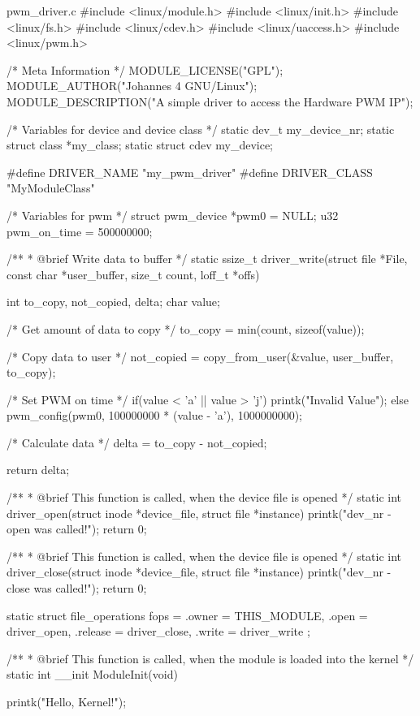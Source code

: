 \documentclass[lang=cn,newtx,10pt,scheme=chinese]{elegantbook}
\begin{document}
\begin{mycode}{pwm\_driver.c}
#include <linux/module.h>
#include <linux/init.h>
#include <linux/fs.h>
#include <linux/cdev.h>
#include <linux/uaccess.h>
#include <linux/pwm.h>

/* Meta Information */
MODULE_LICENSE("GPL");
MODULE_AUTHOR("Johannes 4 GNU/Linux");
MODULE_DESCRIPTION("A simple driver to access the Hardware PWM IP");

/* Variables for device and device class */
static dev_t my_device_nr;
static struct class *my_class;
static struct cdev my_device;

#define DRIVER_NAME "my_pwm_driver"
#define DRIVER_CLASS "MyModuleClass"

/* Variables for pwm  */
struct pwm_device *pwm0 = NULL;
u32 pwm_on_time = 500000000;

/**
 * @brief Write data to buffer
 */
static ssize_t driver_write(struct file *File, const char *user_buffer, size_t count, loff_t *offs) {
    int to_copy, not_copied, delta;
    char value;

    /* Get amount of data to copy */
    to_copy = min(count, sizeof(value));

    /* Copy data to user */
    not_copied = copy_from_user(&value, user_buffer, to_copy);

    /* Set PWM on time */
    if(value < 'a' || value > 'j')
        printk("Invalid Value\n");
    else
        pwm_config(pwm0, 100000000 * (value - 'a'), 1000000000);

    /* Calculate data */
    delta = to_copy - not_copied;

    return delta;
}

/**
 * @brief This function is called, when the device file is opened
 */
static int driver_open(struct inode *device_file, struct file *instance) {
    printk("dev_nr - open was called!\n");
    return 0;
}

/**
 * @brief This function is called, when the device file is opened
 */
static int driver_close(struct inode *device_file, struct file *instance) {
    printk("dev_nr - close was called!\n");
    return 0;
}

static struct file_operations fops = {
    .owner = THIS_MODULE,
    .open = driver_open,
    .release = driver_close,
    .write = driver_write
};

/**
 * @brief This function is called, when the module is loaded into the kernel
 */
static int __init ModuleInit(void) {
    printk("Hello, Kernel!\n");

}
\end{mycode}
\end{document}
